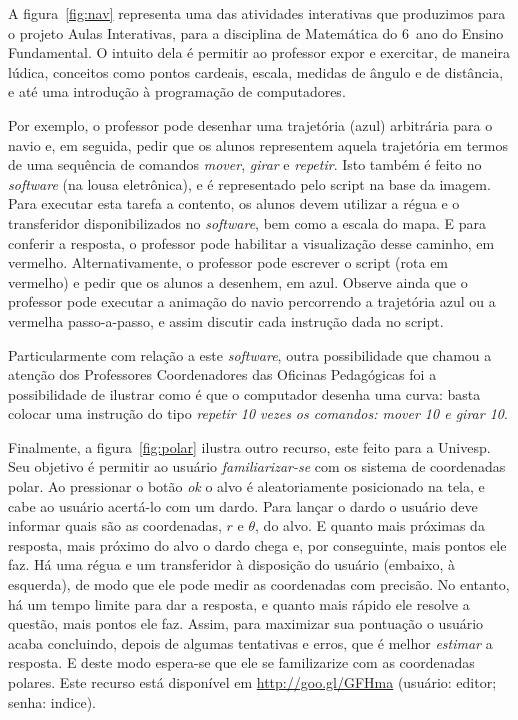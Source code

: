 \documentclass[a4paper,10pt]{scrartcl}					%
\newcommand\foreign[1]{\textsl{#1}}
\begin{document}
	
	A figura~\ref{fig:nav} representa uma das atividades interativas que produzimos para o projeto Aulas Interativas, para a disciplina de Matemática do 6\textordmasculine\ ano do Ensino Fundamental. O intuito dela é permitir ao professor expor e exercitar, de maneira lúdica, conceitos como pontos cardeais, escala, medidas de ângulo e de distância, e até uma introdução à programação de computadores.
	
	Por exemplo, o professor pode desenhar uma trajetória (azul) arbitrária para o navio e, em seguida, pedir que os alunos representem aquela trajetória em termos de uma sequência de comandos \emph{mover}, \emph{girar} e \emph{repetir}. Isto também é feito no \foreign{software} (na lousa eletrônica), e é representado pelo script na base da imagem. Para executar esta tarefa a contento, os alunos devem utilizar a régua e o transferidor disponibilizados no \foreign{software}, bem como a escala do mapa. E para conferir a resposta, o professor pode habilitar a visualização desse caminho, em vermelho. Alternativamente, o professor pode escrever o script (rota em vermelho) e pedir que os alunos a desenhem, em azul. Observe ainda que o professor pode executar a animação do navio percorrendo a trajetória azul ou a vermelha passo-a-passo, e assim discutir cada instrução dada no script.
	
	Particularmente com relação a este \foreign{software}, outra possibilidade que chamou a atenção dos Professores Coordenadores das Oficinas Pedagógicas foi a possibilidade de ilustrar como é que o computador desenha uma curva: basta colocar uma instrução do tipo \emph{repetir 10 vezes os comandos: mover \unit{10}{\kilo\metre} e girar \unit{10}{\degree}}.
	
	Finalmente, a figura~\ref{fig:polar} ilustra outro recurso, este feito para a Univesp. Seu objetivo é permitir ao usuário \emph{familiarizar-se} com os sistema de coordenadas polar. Ao pressionar o botão \emph{ok} o alvo é aleatoriamente posicionado na tela, e cabe ao usuário acertá-lo com um dardo. Para lançar o dardo o usuário deve informar quais são as coordenadas, $r$ e $\theta$, do alvo. E quanto mais próximas da resposta, mais próximo do alvo o dardo chega e, por conseguinte, mais pontos ele faz. Há uma régua e um transferidor à disposição do usuário (embaixo, à esquerda), de modo que ele pode medir as coordenadas com precisão. No entanto, há um tempo limite para dar a resposta, e quanto mais rápido ele resolve a questão, mais pontos ele faz. Assim, para maximizar sua pontuação o usuário acaba concluindo, depois de algumas tentativas e erros, que é melhor \emph{estimar} a resposta. E deste modo espera-se que ele se familizarize com as coordenadas polares. Este recurso está disponível em \url{http://goo.gl/GFHma} (usuário: editor; senha: indice).
	
\end{document}
